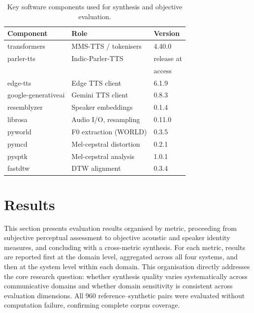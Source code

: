 \documentclass[a4paper,fleqn]{cas-dc}
\begin{document}
    \begin{table}[t]
    \caption{Key software components used for synthesis and objective evaluation.}
    \label{tbl:software}
    \small
    \begin{tabular*}{\columnwidth}{@{\extracolsep{\fill}}lll@{}}
    \toprule
    \textbf{Component} & \textbf{Role} & \textbf{Version} \\
    \midrule
    transformers          & MMS-TTS / tokenisers      & 4.40.0 \\
    parler-tts            & Indic-Parler-TTS          & release at \\ 
                          &                           & access \\
    edge-tts              & Edge TTS client           & 6.1.9 \\
    google-generativeai   & Gemini TTS client         & 0.8.3 \\
    resemblyzer           & Speaker embeddings        & 0.1.4 \\
    librosa               & Audio I/O, resampling     & 0.11.0 \\
    pyworld               & F0 extraction (WORLD)     & 0.3.5 \\
    pymcd                 & Mel-cepstral distortion   & 0.2.1 \\
    pysptk                & Mel-cepstral analysis     & 1.0.1 \\
    fastdtw               & DTW alignment             & 0.3.4 \\
    \bottomrule
    \end{tabular*}
    \end{table}
    
    \section{Results}\label{sec:results}
    
    This section presents evaluation results organised by metric, proceeding
    from subjective perceptual assessment to objective acoustic and speaker
    identity measures, and concluding with a cross-metric synthesis. For each
    metric, results are reported first at the domain level, aggregated across
    all four systems, and then at the system level within each domain. This
    organisation directly addresses the core research question: whether
    synthesis quality varies systematically across communicative domains and
    whether domain sensitivity is consistent across evaluation dimensions.
    All 960 reference--synthetic pairs were evaluated without computation
    failure, confirming complete corpus coverage.
    
\end{document}
